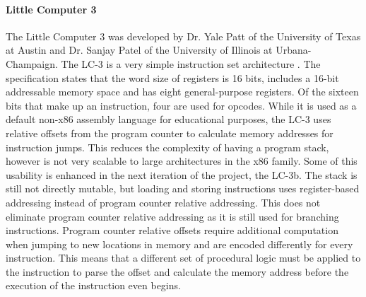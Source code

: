\documentclass[man,hidelinks,floatsintext]{apa7}
\begin{document}
\paragraph{Little Computer 3}
The Little Computer 3 was developed by Dr. Yale Patt of the University of Texas at Austin and Dr. Sanjay Patel of the University of Illinois at Urbana-Champaign. The LC-3 is a very simple instruction set architecture \parencite{lc3}. The specification states that the word size of registers is 16 bits, includes a 16-bit addressable memory space and has eight general-purpose registers. Of the sixteen bits that make up an instruction, four are used for opcodes. While it is used as a default non-x86 assembly language for educational purposes, the LC-3 uses relative offsets from the program counter to calculate memory addresses for instruction jumps. This reduces the complexity of having a program stack, however is not very scalable to large architectures in the x86 family. Some of this usability is enhanced in the next iteration of the project, the LC-3b. The stack is still not directly mutable, but loading and storing instructions uses register-based addressing instead of program counter relative addressing. This does not eliminate program counter relative addressing as it is still used for branching instructions. Program counter relative offsets require additional computation when jumping to new locations in memory and are encoded differently for every instruction. This means that a different set of procedural logic must be applied to the instruction to parse the offset and calculate the memory address before the execution of the instruction even begins.
\end{document}
